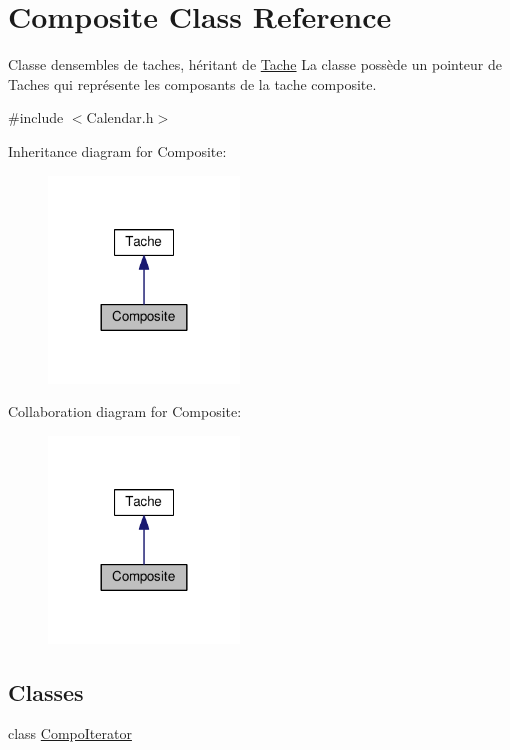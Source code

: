 \hypertarget{class_composite}{}\section{Composite Class Reference}
\label{class_composite}


Classe d\textquotesingle{}ensembles de taches, héritant de \hyperlink{class_tache}{Tache} La classe possède un pointeur de Taches qui représente les composants de la tache composite.  




{\ttfamily \#include $<$Calendar.\+h$>$}



Inheritance diagram for Composite\+:\nopagebreak
\begin{figure}[H]
\begin{center}
\leavevmode
\includegraphics[width=144pt]{class_composite__inherit__graph}
\end{center}
\end{figure}


Collaboration diagram for Composite\+:\nopagebreak
\begin{figure}[H]
\begin{center}
\leavevmode
\includegraphics[width=144pt]{class_composite__coll__graph}
\end{center}
\end{figure}
\subsection*{Classes}
\begin{DoxyCompactItemize}
\item 
class \hyperlink{class_composite_1_1_compo_iterator}{Compo\+Iterator}
\end{DoxyCompactItemize}
